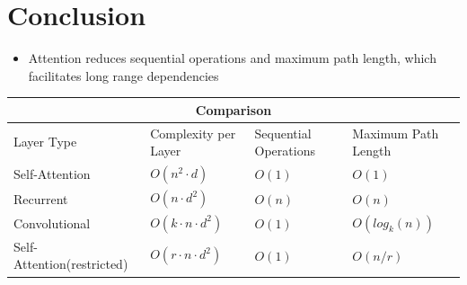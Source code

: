 \documentclass{article}
\begin{document}
\section{Conclusion}
\begin{itemize}
    \item Attention reduces sequential operations and maximum path length, which facilitates long range dependencies
\end{itemize}
\begin{tabular}{ |p{4cm}||p{2cm}|p{2cm}|p{3cm}|  }
 \hline
 \multicolumn{4}{|c|}{Comparison} \\
 \hline
 Layer Type& Complexity per Layer &Sequential Operations & Maximum Path Length\\
 \hline
 Self-Attention   & $O(n^2 \cdot d)$     & $ O(1) $ &   $ O(1) $\\
 Recurrent &   $O(n \cdot d^2)$  & $ O(n) $   & $ O(n) $\\
 Convolutional & $O(k \cdot n \cdot d^2)$  & $ O(1) $ &  $ O( log_k(n) ) $\\
 Self-Attention(restricted)    & $O(r \cdot n \cdot d^2)$  & $ O(1) $ &   $ O(n/r) $\\
 \hline
\end{tabular}
\end{document}

